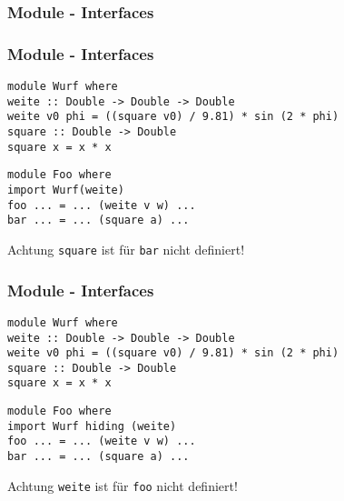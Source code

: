 \begin{frame}
\frametitle{Module - Interfaces}
\end{frame}

\begin{frame}[fragile]
\frametitle{Module - Interfaces} 
\begin{lstlisting}
module Wurf where
weite :: Double -> Double -> Double
weite v0 phi = ((square v0) / 9.81) * sin (2 * phi)
square :: Double -> Double
square x = x * x
\end{lstlisting}
\begin{lstlisting}
module Foo where
import Wurf(weite)
foo ... = ... (weite v w) ...
bar ... = ... (square a) ...
\end{lstlisting}
\begin{alertblock}{Achtung}
\lstinline|square| ist für \lstinline|bar| nicht definiert!
\end{alertblock}
\end{frame}

\begin{frame}[fragile]
\frametitle{Module - Interfaces} 
\begin{lstlisting}
module Wurf where
weite :: Double -> Double -> Double
weite v0 phi = ((square v0) / 9.81) * sin (2 * phi)
square :: Double -> Double
square x = x * x
\end{lstlisting}
\begin{lstlisting}
module Foo where
import Wurf hiding (weite)
foo ... = ... (weite v w) ...
bar ... = ... (square a) ...
\end{lstlisting}
\begin{alertblock}{Achtung}
\lstinline|weite| ist für \lstinline|foo| nicht definiert!
\end{alertblock}
\end{frame}

